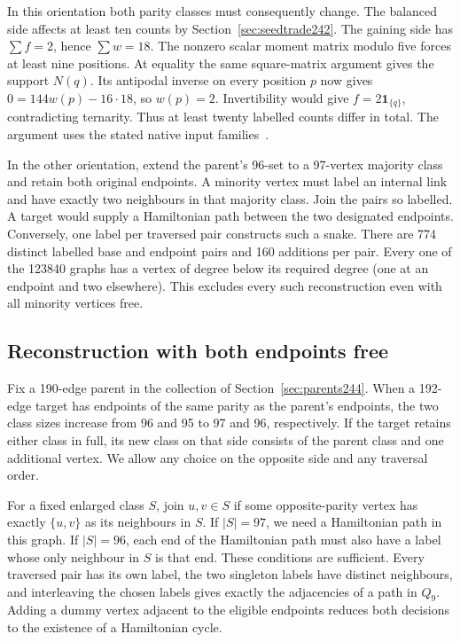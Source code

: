 \documentclass[11pt,a4paper]{article}
\theoremstyle{definition}
\theoremstyle{remark}
\begin{document}
In this orientation both parity classes must consequently change.
The balanced side affects at least ten counts by
Section~\ref{sec:seedtrade242}. The gaining side has $\sum f=2$,
hence $\sum w=18$. The nonzero scalar moment matrix modulo five
forces at least nine positions. At equality the same square-matrix
argument gives the support $N(q)$. Its antipodal inverse on every
position $p$ now gives $0=144w(p)-16\cdot18$, so $w(p)=2$.
Invertibility would give $f=2\mathbf1_{\{q\}}$, contradicting
ternarity. Thus at least twenty labelled counts differ in total.
The argument uses the stated native input families~\cite{parents244}.

In the other orientation, extend the parent's 96-set to a 97-vertex
majority class and retain both original endpoints. A minority vertex
must label an internal link and have exactly two neighbours in that
majority class. Join the pairs so labelled. A target would supply a
Hamiltonian path between the two designated endpoints. Conversely,
one label per traversed pair constructs such a snake. There are 774
distinct labelled base and endpoint pairs and 160 additions per pair.
Every one of the 123840 graphs has a vertex of degree below its
required degree (one at an endpoint and two elsewhere). This excludes
every such reconstruction even with all minority vertices free.

\subsection{Reconstruction with both endpoints free}\label{sec:free245}
Fix a 190-edge parent in the collection of Section~\ref{sec:parents244}.
When a 192-edge target has endpoints of the same parity as the parent's
endpoints, the two class sizes increase from 96 and 95 to 97 and 96,
respectively. If the target retains either class in full, its new
class on that side consists of the parent class and one additional
vertex. We allow any choice on the opposite side and any traversal order.

For a fixed enlarged class $S$, join $u,v\in S$ if some opposite-parity
vertex has exactly $\{u,v\}$ as its neighbours in $S$. If $|S|=97$,
we need a Hamiltonian path in this graph. If $|S|=96$, each end of the
Hamiltonian path must also have a label whose only neighbour in $S$
is that end. These conditions are sufficient. Every traversed pair has
its own label, the two singleton labels have distinct neighbours, and
interleaving the chosen labels gives exactly the adjacencies of a path
in $Q_9$. Adding a dummy vertex adjacent to the eligible endpoints
reduces both decisions to the existence of a Hamiltonian cycle.
\end{document}
